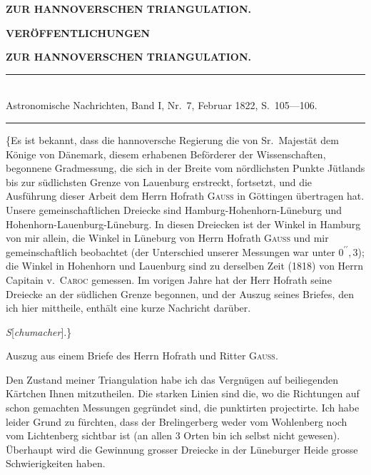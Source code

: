 \clearpage
\noindent{}\hfill{\small\textbf{ZUR HANNOVERSCHEN TRIANGULATION.}}\hfill\null\par\medskip
\begin{center}
{\large\textbf{VERÖFFENTLICHUNGEN}}\par\bigskip
{\large\textbf{ZUR HANNOVERSCHEN TRIANGULATION.}}\par\medskip
[II.]\par\bigskip
\rule{.74\linewidth}{.4pt}\\[-.5ex]
{\small Astronomische Nachrichten, Band I, Nr.~7, Februar 1822, S.~105---106.}\\[-.5ex]
\rule{.74\linewidth}{.4pt}
\end{center}
\par\noindent\hspace*{\parindent}\{Es ist bekannt, dass die hannoversche Regierung die von Sr.~Majestät dem Könige von Dänemark, diesem erhabenen Beförderer der Wissenschaften, begonnene Gradmessung, die sich in der Breite vom nördlichsten Punkte Jütlands bis zur südlichsten Grenze von Lauenburg erstreckt, fortsetzt, und die Ausführung dieser Arbeit dem Herrn Hofrath \textsc{Gauss} in Göttingen übertragen hat. Unsere gemeinschaftlichen Dreiecke sind Hamburg-Hohenhorn-Lüneburg und Hohenhorn-Lauenburg-Lüneburg. In diesen Dreiecken ist der Winkel in Hamburg von mir allein, die Winkel in Lüneburg von Herrn Hofrath \textsc{Gauss} und mir gemeinschaftlich beobachtet (der Unterschied unserer Messungen war unter \(0^{\prime\prime}{,}3\)); die Winkel in Hohenhorn und Lauenburg sind zu derselben Zeit (1818) von Herrn Capitain v.~\textsc{Caroc} gemessen. Im vorigen Jahre hat der Herr Hofrath seine Dreiecke an der südlichen Grenze begonnen, und der Auszug seines Briefes, den ich hier mittheile, enthält eine kurze Nachricht darüber.
\par\noindent\hfill\textit{S}[\textit{chumacher}].\}\par
\begin{center}Auszug aus einem Briefe des Herrn Hofrath und Ritter \textsc{Gauss}.\end{center}
\par\noindent\hspace*{\parindent}Den Zustand meiner Triangulation habe ich das Vergnügen auf beiliegenden Kärtchen Ihnen mitzutheilen. Die starken Linien sind die, wo die Richtungen auf schon gemachten Messungen gegründet sind, die punktirten projectirte. Ich habe leider Grund zu fürchten, dass der Brelingerberg weder vom Wohlenberg noch vom Lichtenberg sichtbar ist (an allen 3 Orten bin ich selbst nicht gewesen). Überhaupt wird die Gewinnung grosser Dreiecke in der Lüneburger Heide grosse Schwierigkeiten haben.

